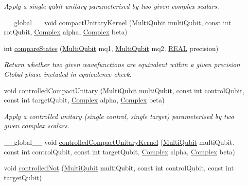 \begin{DoxyCompactItemize}
\begin{DoxyCompactList}\small\item\em Apply a single-\/qubit unitary parameterised by two given complex scalars. \end{DoxyCompactList}\item 
\+\_\+\+\_\+global\+\_\+\+\_\+ void \mbox{\hyperlink{QuEST__env__localGPU_8cu_aec6ec83ed63a7848ddb8f16c88846d25}{compact\+Unitary\+Kernel}} (\mbox{\hyperlink{structMultiQubit}{Multi\+Qubit}} multi\+Qubit, const int rot\+Qubit, \mbox{\hyperlink{structComplex}{Complex}} alpha, \mbox{\hyperlink{structComplex}{Complex}} beta)
\item 
int \mbox{\hyperlink{QuEST__env__localGPU_8cu_a793584932ae384c82e7e42db7d35d18d}{compare\+States}} (\mbox{\hyperlink{structMultiQubit}{Multi\+Qubit}} mq1, \mbox{\hyperlink{structMultiQubit}{Multi\+Qubit}} mq2, \mbox{\hyperlink{QuEST__precision_8h_a4b654506f18b8bfd61ad2a29a7e38c25}{R\+E\+AL}} precision)
\begin{DoxyCompactList}\small\item\em Return whether two given wavefunctions are equivalent within a given precision Global phase included in equivalence check. \end{DoxyCompactList}\item 
void \mbox{\hyperlink{QuEST__env__localGPU_8cu_ab4812953bc457405b3aa05a4c2f64f4a}{controlled\+Compact\+Unitary}} (\mbox{\hyperlink{structMultiQubit}{Multi\+Qubit}} multi\+Qubit, const int control\+Qubit, const int target\+Qubit, \mbox{\hyperlink{structComplex}{Complex}} alpha, \mbox{\hyperlink{structComplex}{Complex}} beta)
\begin{DoxyCompactList}\small\item\em Apply a controlled unitary (single control, single target) parameterised by two given complex scalars. \end{DoxyCompactList}\item 
\+\_\+\+\_\+global\+\_\+\+\_\+ void \mbox{\hyperlink{QuEST__env__localGPU_8cu_ac9af28ce6412c545805c6275ad7636d5}{controlled\+Compact\+Unitary\+Kernel}} (\mbox{\hyperlink{structMultiQubit}{Multi\+Qubit}} multi\+Qubit, const int control\+Qubit, const int target\+Qubit, \mbox{\hyperlink{structComplex}{Complex}} alpha, \mbox{\hyperlink{structComplex}{Complex}} beta)
\item 
void \mbox{\hyperlink{QuEST__env__localGPU_8cu_a67576895bbc65463481a8ea24d9b1e22}{controlled\+Not}} (\mbox{\hyperlink{structMultiQubit}{Multi\+Qubit}} multi\+Qubit, const int control\+Qubit, const int target\+Qubit)

\end{DoxyCompactItemize}
